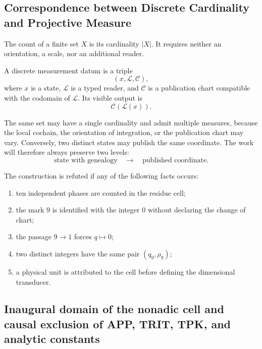 \subsection{Correspondence between Discrete Cardinality and Projective Measure}

\begin{definition}[Counting]
The count of a finite set \(X\) is its cardinality \(|X|\). It requires
neither an orientation, a scale, nor an additional reader.
\end{definition}

\begin{definition}
A discrete measurement datum is a triple
\[
 (x,\mathcal L,\mathcal C),
\]
where \(x\) is a state, \(\mathcal L\) is a typed reader, and
\(\mathcal C\) is a publication chart compatible with the codomain of
\(\mathcal L\). Its visible output is
\[
 \mathcal C(\mathcal L(x)).
\]
\end{definition}

The same set may have a single cardinality and admit multiple measures,
because the local cochain, the orientation of integration, or the
publication chart may vary. Conversely, two distinct states may publish the
same coordinate. The work will therefore always preserve two levels:
\[
 \text{state with genealogy}
 \quad\longrightarrow\quad
 \text{published coordinate}.
\]

\begin{criterion}
The construction is refuted if any of the following
facts occurs:
\begin{enumerate}
 \item ten independent phases are counted in the residue cell;
 \item the mark \(9\) is identified with the integer \(0\) without declaring the
 change of chart;
 \item the passage \(9\to1\) forces \(q\mapsto0\);
 \item two distinct integers have the same pair \((q_9,\rho_9)\);
 \item a physical unit is attributed to the cell before defining the
 dimensional transducer.
\end{enumerate}
\end{criterion}

\subsection{Inaugural domain of the nonadic cell and causal exclusion of APP, TRIT, TPK, and analytic constants}

